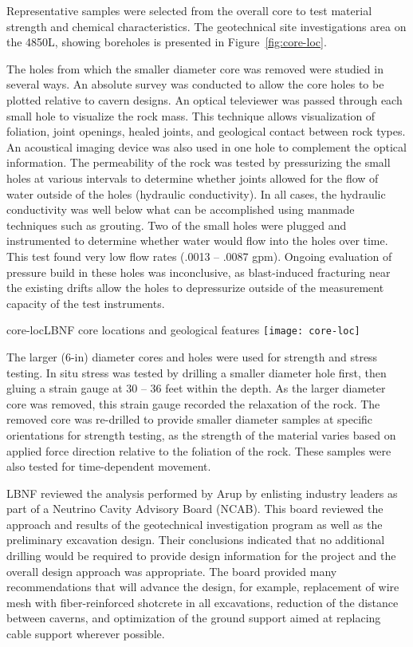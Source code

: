 Representative samples were selected from the overall core to test material strength and chemical characteristics. The geotechnical site investigations area on the 4850L, showing boreholes is presented in Figure~\ref{fig:core-loc}. 

The holes from which the smaller diameter core was removed were studied in several ways.  An absolute survey was conducted to allow the core holes to be plotted relative to cavern designs.  An optical televiewer was passed through each small hole to visualize the rock mass.  This technique allows visualization of foliation, joint openings, healed joints, and geological contact between rock types.  An acoustical imaging device was also used in one hole to complement the optical information.  The permeability of the rock was tested by pressurizing the small holes at various intervals to determine whether joints allowed for the flow of water outside of the holes (hydraulic conductivity).  In all cases, the hydraulic conductivity was well below what can be accomplished using manmade techniques such as grouting.   Two of the small holes were plugged and instrumented to determine whether water would flow into the holes over time.  This test found very low flow rates (.0013 -- .0087 gpm).  Ongoing evaluation of pressure build in these holes was inconclusive, as blast-induced fracturing near the existing drifts allow the holes to depressurize outside of the measurement capacity of the test instruments.

\begin{cdrfigure}{core-loc}{LBNF core locations and geological features}
\texttt{[image: core-loc]}
\end{cdrfigure}

The larger (6-in) diameter cores and holes were used for strength and stress testing.  In situ stress was tested by drilling a smaller diameter hole first, then gluing a strain gauge at 30 -- 36 feet within the depth.  As the larger diameter core was removed, this strain gauge recorded the relaxation of the rock.  The removed core was re-drilled to provide smaller diameter samples at specific orientations for strength testing, as the strength of the material varies based on applied force direction relative to the foliation of the rock.  These samples were also tested for time-dependent movement. 

LBNF reviewed the analysis performed by Arup by enlisting industry leaders as part of a Neutrino Cavity Advisory Board (NCAB).  This board reviewed the %
approach and results of the geotechnical investigation program as well as the preliminary excavation design.  Their conclusions indicated that no additional drilling would be required to provide design information for the project and the overall design approach was appropriate.  The board provided many recommendations that will %
advance the design, 
for example, replacement of wire mesh with fiber-reinforced shotcrete in all excavations, reduction of the distance between caverns, and optimization of the ground support aimed at replacing cable support wherever possible. 



